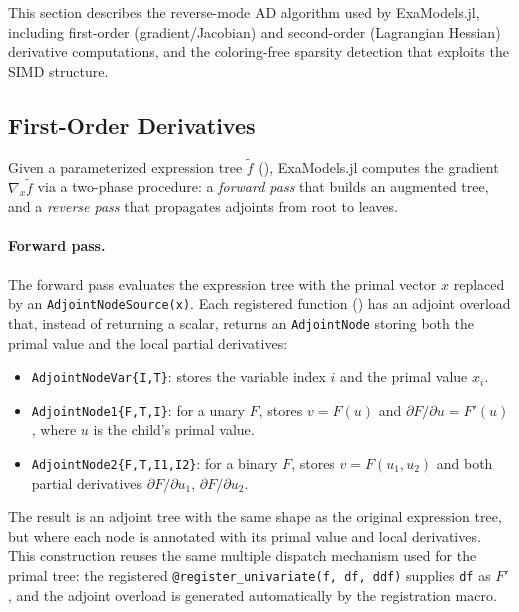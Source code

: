 \documentclass[11pt]{article}
\begin{document}
This section describes the reverse-mode AD algorithm used by ExaModels.jl, including first-order (gradient/Jacobian) and second-order (Lagrangian Hessian) derivative computations, and the coloring-free sparsity detection that exploits the SIMD structure.

\subsection{First-Order Derivatives}
\label{sec:ad:first}

Given a parameterized expression tree $\tilde{f}$ (), ExaModels.jl computes the gradient $\nabla_x \tilde{f}$ via a two-phase procedure: a \emph{forward pass} that builds an augmented tree, and a \emph{reverse pass} that propagates adjoints from root to leaves.

\paragraph{Forward pass.}
The forward pass evaluates the expression tree with the primal vector $x$ replaced by an \texttt{AdjointNodeSource(x)}. Each registered function () has an adjoint overload that, instead of returning a scalar, returns an \texttt{AdjointNode} storing both the primal value and the local partial derivatives:
\begin{itemize}
  \item \texttt{AdjointNodeVar\{I,T\}}: stores the variable index $i$ and the primal value $x_i$.
  \item \texttt{AdjointNode1\{F,T,I\}}: for a unary $F$, stores $v = F(u)$ and $\partial F/\partial u = F'(u)$, where $u$ is the child's primal value.
  \item \texttt{AdjointNode2\{F,T,I1,I2\}}: for a binary $F$, stores $v = F(u_1, u_2)$ and both partial derivatives $\partial F/\partial u_1$, $\partial F/\partial u_2$.
\end{itemize}
The result is an adjoint tree with the same shape as the original expression tree, but where each node is annotated with its primal value and local derivatives. This construction reuses the same multiple dispatch mechanism used for the primal tree: the registered \texttt{@register\_univariate(f, df, ddf)} supplies \texttt{df} as $F'$, and the adjoint overload is generated automatically by the registration macro.
\end{document}
